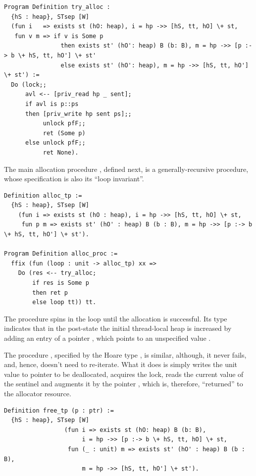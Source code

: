 \begin{lstlisting}
Program Definition try_alloc : 
  {hS : heap}, STsep [W] 
  (fun i   => exists st (hO: heap), i = hp ->> [hS, tt, hO] \+ st,
   fun v m => if v is Some p  
                then exists st' (hO': heap) B (b: B), m = hp ->> [p :-> b \+ hS, tt, hO'] \+ st'
                else exists st' (hO': heap), m = hp ->> [hS, tt, hO'] \+ st') :=
  Do (lock;;
      avl <-- [priv_read hp _ sent];
      if avl is p::ps
      then [priv_write hp sent ps];;
           unlock pfF;;
           ret (Some p)
      else unlock pfF;;
           ret None).  
\end{lstlisting}

The main allocation procedure , defined next, is a
generally-recursive procedure, whose specification  is
also its ``loop invariant''.

\begin{lstlisting}
Definition alloc_tp :=
  {hS : heap}, STsep [W] 
    (fun i => exists st (hO : heap), i = hp ->> [hS, tt, hO] \+ st,
     fun p m => exists st' (hO' : heap) B (b : B), m = hp ->> [p :-> b \+ hS, tt, hO'] \+ st').

Program Definition alloc_proc := 
  ffix (fun (loop : unit -> alloc_tp) xx =>
    Do (res <-- try_alloc; 
        if res is Some p 
        then ret p
        else loop tt)) tt.  
\end{lstlisting}

The procedure spins in the loop until the allocation is successful. Its
type indicates that in the post-state the initial thread-local heap
 is increased by adding an entry of a pointer ,
which points to an unspecified value .

The procedure , specified by the Hoare type
, is similar, although, it never fails, and, hence,
doesn't need to re-iterate. What it does is simply writes the unit
value  to pointer to be deallocated, acquires the lock, reads
the current value of the sentinel and augments it by the pointer
, which is, therefore, ``returned'' to the allocator resource.

\begin{lstlisting}
Definition free_tp (p : ptr) :=
  {hS : heap}, STsep [W] 
                 (fun i => exists st (hO: heap) B (b: B),
                      i = hp ->> [p :-> b \+ hS, tt, hO] \+ st,
                  fun (_ : unit) m => exists st' (hO' : heap) B (b : B), 
                      m = hp ->> [hS, tt, hO'] \+ st').
\end{lstlisting}

